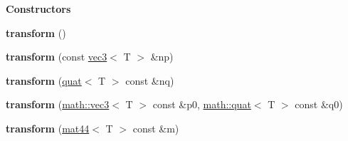 \begin{Indent}{\bf Constructors}\par
{\em \label{_amgrp559a25fdb98a7d1fd1c3771ac568d5e9}
 }\begin{DoxyCompactItemize}
\item 
\hypertarget{classmath_1_1transform_aac5c96a861fd0efa2f59b934aa18209b}{
{\bfseries transform} ()}
\label{classmath_1_1transform_aac5c96a861fd0efa2f59b934aa18209b}

\item 
\hypertarget{classmath_1_1transform_a286e8ce2993df01e0dfce04155acc6c2}{
{\bfseries transform} (const \hyperlink{classmath_1_1vec3}{vec3}$<$ T $>$ \&np)}
\label{classmath_1_1transform_a286e8ce2993df01e0dfce04155acc6c2}

\item 
\hypertarget{classmath_1_1transform_ae93a4f522574b2b1e7445aa3f6098a9e}{
{\bfseries transform} (\hyperlink{classmath_1_1quat}{quat}$<$ T $>$ const \&nq)}
\label{classmath_1_1transform_ae93a4f522574b2b1e7445aa3f6098a9e}

\item 
\hypertarget{classmath_1_1transform_add86a044307ee97f01b15cec892fd1d2}{
{\bfseries transform} (\hyperlink{classmath_1_1vec3}{math::vec3}$<$ T $>$ const \&p0, \hyperlink{classmath_1_1quat}{math::quat}$<$ T $>$ const \&q0)}
\label{classmath_1_1transform_add86a044307ee97f01b15cec892fd1d2}

\item 
\hypertarget{classmath_1_1transform_a78c9a25db2506ca71a89c2890733fa0f}{
{\bfseries transform} (\hyperlink{classmath_1_1mat44}{mat44}$<$ T $>$ const \&m)}
\label{classmath_1_1transform_a78c9a25db2506ca71a89c2890733fa0f}

\end{DoxyCompactItemize}
\end{Indent}
